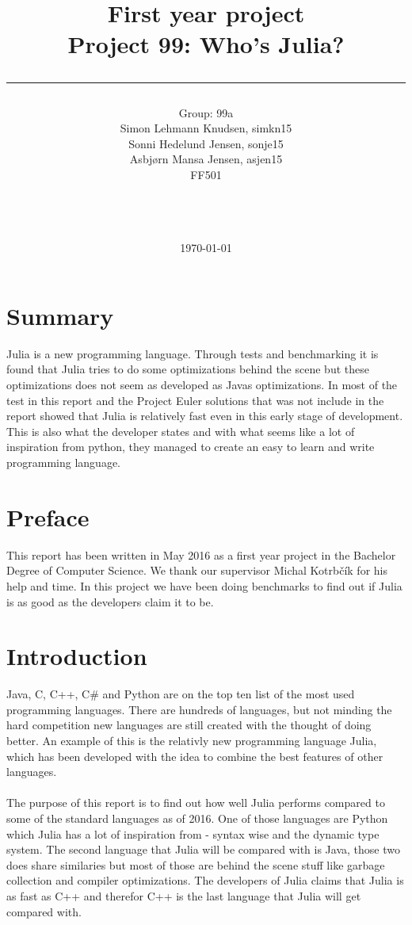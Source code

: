 \documentclass[a4paper, 11pt, titlepage]{article}
\title{First year project\\Project 99: Who's Julia?\\\rule{10cm}{0.5mm}}
\author{Group: 99a\\Simon Lehmann Knudsen, simkn15\\Sonni Hedelund Jensen, sonje15\\Asbjørn Mansa Jensen, asjen15
	\\ FF501\\\rule{5.5cm}{0.5mm}\\}
\date{\today}
\begin{document}
\maketitle

\vfill

\newpage
{}
\section{Summary}
Julia is a new programming language. Through tests and benchmarking it is found that Julia tries to do some optimizations behind the scene but these optimizations does not seem as developed as Javas optimizations. In most of the test in this report and the Project Euler solutions that was not include in the report showed that Julia is relatively fast even in this early stage of development. This is also what the developer states and with what seems like a lot of inspiration from python, they managed to create an easy to learn and write programming language.

\section{Preface}
This report has been written in May 2016 as a first year project in the Bachelor Degree of Computer Science. We thank our supervisor Michal Kotrbčík for his help and time.
In this project we have been doing benchmarks to find out if Julia is as good as the developers claim it to be. 

\newpage
\tableofcontents

\newpage
{}
\pagestyle{fancy}
\fancyhf{}
\section{Introduction}
Java, C, C++, C\# and Python are on the top ten list of the most used programming languages. There are hundreds of languages, but not minding the hard competition new languages are still created with the thought of doing better. An example of this is the relativly new programming language Julia, which has been developed with the idea to combine the best features of other languages.\\
\\
The purpose of this report is to find out how well Julia performs compared to some of the standard languages as of 2016. One of those languages are Python which Julia has a lot of inspiration from - syntax wise and the dynamic type system. The second language that Julia will be compared with is Java, those two does share similaries but most of those are behind the scene stuff like garbage collection and compiler optimizations. The developers of Julia claims that Julia is as fast as C++ and therefor C++ is the last language that Julia will get compared with.
\end{document}
